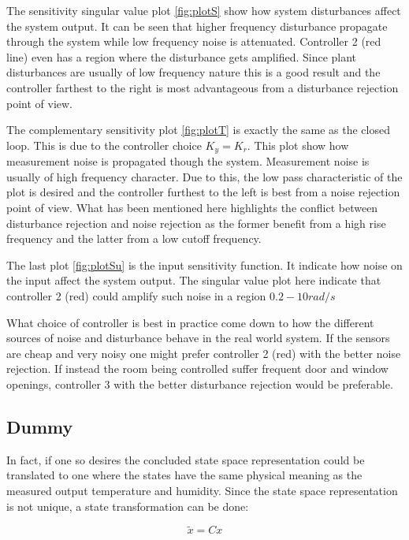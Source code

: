 \documentclass[a4paper, titlepage]{article}
\begin{document}
The sensitivity singular value plot \ref{fig:plotS} show how system disturbances affect the system output.
It can be seen that higher frequency disturbance propagate through the system while low frequency noise is attenuated.
Controller 2 (red line) even has a region where the disturbance gets amplified.
Since plant disturbances are usually of low frequency nature this is a good result and the controller farthest to the right is most advantageous from a disturbance rejection point of view.

The complementary sensitivity plot \ref{fig:plotT} is exactly the same as the closed loop.
This is due to the controller choice $K_y = K_r$.
This plot show how measurement noise is propagated though the system.
Measurement noise is usually of high frequency character.
Due to this, the low pass characteristic of the plot is desired and the controller furthest to the left is best from a noise rejection point of view.
What has been mentioned here highlights the conflict between disturbance rejection and noise rejection as the former benefit from a high rise frequency and the latter from a low cutoff frequency.

The last plot \ref{fig:plotSu} is the input sensitivity function.
It indicate how noise on the input affect the system output.
The singular value plot here indicate that controller 2 (red) could amplify such noise in a region $0.2 - 10 rad/s$

What choice of controller is best in practice come down to how the different sources of noise and disturbance behave in the real world system.
If the sensors are cheap and very noisy one might prefer  controller 2 (red) with the better noise rejection.
If instead the room being controlled suffer frequent door and window openings, controller 3 with the better disturbance rejection would be preferable.

\subsection{Dummy}
In fact, if one so desires the concluded state space representation could be translated to one where the states have the same physical meaning as the measured output temperature and humidity. 
Since the state space representation is not unique, a state transformation can be done:

\begin{equation}
\tilde{x} = Cx
\end{equation}
\end{document}
